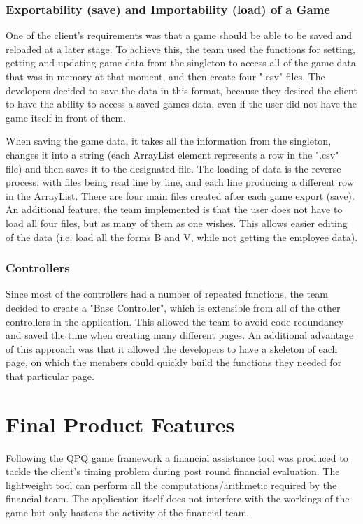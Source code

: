 \documentclass{l3proj}
\begin{document}
\subsubsection{Exportability (save) and Importability (load) of a Game}
One of the client's requirements was that a game should be able to be saved and reloaded at a later stage. To achieve this, the team used the functions for setting, getting and updating game data from the singleton to access all of the game data that was in memory at that moment, and then create four ".csv" files. The developers decided to save the data in this format, because they desired the client to have the ability to access a saved games data, even if the user did not have the game itself in front of them.

When saving the game data, it takes all the information from the singleton, changes it into a string (each ArrayList element represents a row in the ".csv" file) and then saves it to the designated file. The loading of data is the reverse process, with files being read line by line, and each line producing a different row in the ArrayList. There are four main files created after each game export (save). An additional feature, the team implemented is that the user does not have to load all four files, but as many of them as one wishes. This allows easier editing of the data (i.e. load all the forms B and V, while not getting the employee data).

\subsubsection{Controllers}
Since most of the controllers had a number of repeated functions, the team decided to create a "Base Controller", which is extensible from all of the other controllers in the application. This allowed the team to avoid code redundancy and saved the time when creating many different pages. An additional advantage of this approach was that it allowed the developers to have a skeleton of each page, on which the members could quickly build the functions they needed for that particular page.

\section{Final Product Features}
\label{sec:finalproduct}
Following the QPQ game framework a financial assistance tool was produced to tackle the client's timing problem during post round financial evaluation. The lightweight tool can perform all the computations/arithmetic required by the financial team. The application itself does not interfere with the workings of the game but only hastens the activity of the financial team.
\end{document}
